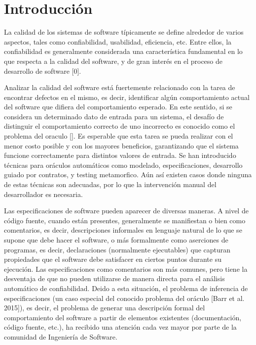 \chapter{Introducción}


La calidad de los sistemas de software típicamente se define alrededor de varios aspectos, tales como confiabilidad, usabilidad, eficiencia, etc. Entre ellos, la confiabilidad es generalmente considerada una característica fundamental en lo que respecta a la calidad del software, y de gran interés en el proceso de desarrollo de software [0]. 

Analizar la calidad del software está fuertemente relacionado con la tarea de encontrar defectos en el mismo, es decir, identificar algún comportamiento actual del software que difiera del comportamiento esperado. En este sentido, si se considera un determinado dato de entrada para un sistema, el desafío de distinguir el comportamiento correcto de uno incorrecto es conocido como el problema del oraculo []. Es esperable que esta tarea se pueda realizar con el menor costo posible y con los mayores beneficios, garantizando que el sistema funcione correctamente para distintos valores de entrada. 
Se han introducido técnicas para oráculos automáticos como modelado, especificaciones, desarrollo guiado por contratos, y testing metamorfico. Aún así existen casos donde ninguna de estas técnicas son adecuadas, por lo que la intervención manual del desarrollador es necesaria.

Las especificaciones de software pueden aparecer de diversas maneras. A nivel de código fuente, cuando están presentes, generalmente se manifiestan o bien como comentarios, es decir, descripciones informales en lenguaje natural de lo que se supone que debe hacer el software, o más formalmente como aserciones de programas, es decir, declaraciones (normalmente ejecutables) que capturan propiedades que el software debe satisfacer en ciertos puntos durante su ejecución. Las especificaciones como comentarios son más comunes, pero tiene la desventaja de que no pueden utilizarse de manera directa para el análisis automático de confiabilidad. 
Deido a esta situación, el problema de inferencia de especificaciones (un caso especial del conocido problema del oráculo [Barr et al. 2015]), es decir, el problema de generar una descripción formal del comportamiento del software a partir de elementos existentes (documentación, código fuente, etc.), ha recibido una atención cada vez mayor por parte de la comunidad de Ingeniería de Software.

